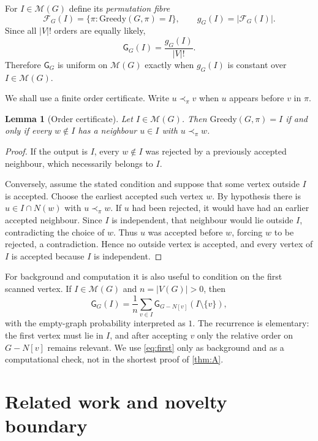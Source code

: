 \documentclass[11pt]{article}
\newtheorem{lemma}[theorem]{Lemma}
\theoremstyle{definition}
\newcommand{\M}{\mathcal{M}}
\newcommand{\GG}{\mathsf{G}}
\begin{document}
For $I\in\M(G)$ define its \emph{permutation fibre}
\[
 \mathcal F_G(I)=\{\pi:\mathrm{Greedy}(G,\pi)=I\},
 \qquad g_G(I)=|\mathcal F_G(I)|.
\]
Since all $|V|!$ orders are equally likely,
\[
 \GG_G(I)=\frac{g_G(I)}{|V|!}.
\]
Therefore $\GG_G$ is uniform on $\M(G)$ exactly when $g_G(I)$ is constant over $I\in\M(G)$.

We shall use a finite order certificate.  Write $u\prec_\pi v$ when $u$ appears before $v$ in $\pi$.

\begin{lemma}[Order certificate]\label{lem:certificate}
Let $I\in\M(G)$.  Then $\mathrm{Greedy}(G,\pi)=I$ if and only if every $w\notin I$ has a neighbour $u\in I$ with $u\prec_\pi w$.
\end{lemma}

\begin{proof}
If the output is $I$, every $w\notin I$ was rejected by a previously accepted neighbour, which necessarily belongs to $I$.

Conversely, assume the stated condition and suppose that some vertex outside $I$ is accepted.  Choose the earliest accepted such vertex $w$.  By hypothesis there is $u\in I\cap N(w)$ with $u\prec_\pi w$.  If $u$ had been rejected, it would have had an earlier accepted neighbour.  Since $I$ is independent, that neighbour would lie outside $I$, contradicting the choice of $w$.  Thus $u$ was accepted before $w$, forcing $w$ to be rejected, a contradiction.  Hence no outside vertex is accepted, and every vertex of $I$ is accepted because $I$ is independent.
\end{proof}

For background and computation it is also useful to condition on the first scanned vertex.  If $I\in\M(G)$ and $n=|V(G)|>0$, then
\begin{equation}\label{eq:first}
 \GG_G(I)=\frac1n\sum_{v\in I}
 \GG_{G-N[v]}(I\setminus\{v\}),
\end{equation}
with the empty-graph probability interpreted as $1$.  The recurrence is elementary: the first vertex must lie in $I$, and after accepting $v$ only the relative order on $G-N[v]$ remains relevant.  We use \eqref{eq:first} only as background and as a computational check, not in the shortest proof of \cref{thm:A}.

\section{Related work and novelty boundary}\label{sec:related}
\end{document}

